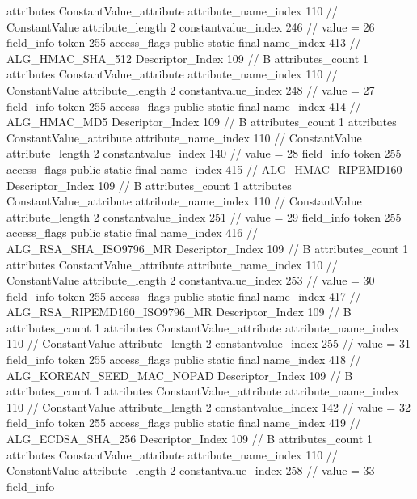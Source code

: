 {{{{{				attributes {
				ConstantValue_attribute {
					attribute_name_index	110		// ConstantValue
					attribute_length	2
					constantvalue_index	246		// value = 26
				}
				}
			}
			field_info {
				token	255
				access_flags	public static final
				name_index	413		// ALG_HMAC_SHA_512
				Descriptor_Index	109		// B
				attributes_count	1
				attributes {
				ConstantValue_attribute {
					attribute_name_index	110		// ConstantValue
					attribute_length	2
					constantvalue_index	248		// value = 27
				}
				}
			}
			field_info {
				token	255
				access_flags	public static final
				name_index	414		// ALG_HMAC_MD5
				Descriptor_Index	109		// B
				attributes_count	1
				attributes {
				ConstantValue_attribute {
					attribute_name_index	110		// ConstantValue
					attribute_length	2
					constantvalue_index	140		// value = 28
				}
				}
			}
			field_info {
				token	255
				access_flags	public static final
				name_index	415		// ALG_HMAC_RIPEMD160
				Descriptor_Index	109		// B
				attributes_count	1
				attributes {
				ConstantValue_attribute {
					attribute_name_index	110		// ConstantValue
					attribute_length	2
					constantvalue_index	251		// value = 29
				}
				}
			}
			field_info {
				token	255
				access_flags	public static final
				name_index	416		// ALG_RSA_SHA_ISO9796_MR
				Descriptor_Index	109		// B
				attributes_count	1
				attributes {
				ConstantValue_attribute {
					attribute_name_index	110		// ConstantValue
					attribute_length	2
					constantvalue_index	253		// value = 30
				}
				}
			}
			field_info {
				token	255
				access_flags	public static final
				name_index	417		// ALG_RSA_RIPEMD160_ISO9796_MR
				Descriptor_Index	109		// B
				attributes_count	1
				attributes {
				ConstantValue_attribute {
					attribute_name_index	110		// ConstantValue
					attribute_length	2
					constantvalue_index	255		// value = 31
				}
				}
			}
			field_info {
				token	255
				access_flags	public static final
				name_index	418		// ALG_KOREAN_SEED_MAC_NOPAD
				Descriptor_Index	109		// B
				attributes_count	1
				attributes {
				ConstantValue_attribute {
					attribute_name_index	110		// ConstantValue
					attribute_length	2
					constantvalue_index	142		// value = 32
				}
				}
			}
			field_info {
				token	255
				access_flags	public static final
				name_index	419		// ALG_ECDSA_SHA_256
				Descriptor_Index	109		// B
				attributes_count	1
				attributes {
				ConstantValue_attribute {
					attribute_name_index	110		// ConstantValue
					attribute_length	2
					constantvalue_index	258		// value = 33
				}
				}
			}
			field_info {
}}}}}
